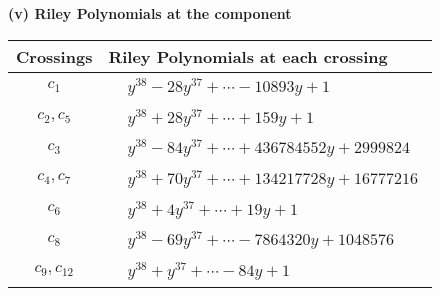 \documentclass[1p]{elsarticle_modified}
\theoremstyle{definition}
\begin{document}
\newpage\renewcommand{\arraystretch}{1}
\flushleft \textbf{(v) Riley Polynomials at the component}\newline \\
\begin{tabular}{m{50pt}|m{274pt}}
Crossings & \hspace{64pt}Riley Polynomials at each crossing \\
\hline $$\begin{aligned}c_{1}\end{aligned}$$&$\begin{aligned}
&y^{38}-28 y^{37}+\cdots-10893 y+1
\end{aligned}$\\
\hline $$\begin{aligned}c_{2},c_{5}\end{aligned}$$&$\begin{aligned}
&y^{38}+28 y^{37}+\cdots+159 y+1
\end{aligned}$\\
\hline $$\begin{aligned}c_{3}\end{aligned}$$&$\begin{aligned}
&y^{38}-84 y^{37}+\cdots+436784552 y+2999824
\end{aligned}$\\
\hline $$\begin{aligned}c_{4},c_{7}\end{aligned}$$&$\begin{aligned}
&y^{38}+70 y^{37}+\cdots+134217728 y+16777216
\end{aligned}$\\
\hline $$\begin{aligned}c_{6}\end{aligned}$$&$\begin{aligned}
&y^{38}+4 y^{37}+\cdots+19 y+1
\end{aligned}$\\
\hline $$\begin{aligned}c_{8}\end{aligned}$$&$\begin{aligned}
&y^{38}-69 y^{37}+\cdots-7864320 y+1048576
\end{aligned}$\\
\hline $$\begin{aligned}c_{9},c_{12}\end{aligned}$$&$\begin{aligned}
&y^{38}+y^{37}+\cdots-84 y+1
\end{aligned}$\\

\end{tabular}
\end{document}
